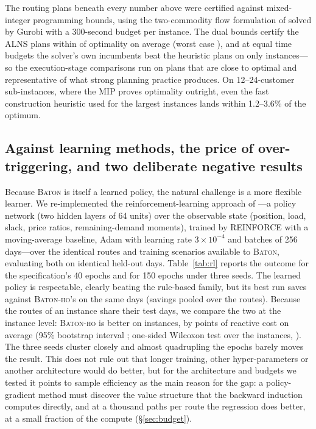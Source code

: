 \documentclass[preprint,authoryear,12pt]{elsarticle}
\theoremstyle{definition}
\theoremstyle{remark}
\begin{document}
The routing plans beneath every number above were certified against
mixed-integer programming bounds, using the two-commodity flow
formulation of \citet{montane2006tabu} solved by Gurobi with a
300-second budget per instance. The dual bounds certify the ALNS plans
within \certGap{} of optimality on average (worst case
\certGapMax{}), and at equal time budgets the solver's own incumbents
beat the heuristic plans on only \certBeatN{} instances---so the
execution-stage comparisons run on plans that are close to optimal and
representative of what strong planning practice produces. On 12--24-customer sub-instances, where the MIP proves
optimality outright, even the fast construction heuristic used for the
largest instances lands within 1.2--3.6\% of the optimum.

\subsection{Against learning methods, the price of over-triggering, and
two deliberate negative results}\label{sec:learning}

Because \textsc{Baton} is itself a learned policy, the natural
challenge is a more flexible learner. We re-implemented the
reinforcement-learning approach of \citet{iklassov2024rl}---a policy
network (two hidden layers of 64 units) over the observable state
(position, load, slack, price ratios, remaining-demand moments), trained
by REINFORCE with a moving-average baseline, Adam with learning rate
$3\times10^{-4}$ and batches of 256 days---over the identical routes and
training scenarios available to \textsc{Baton}, evaluating both on
identical held-out days. Table~\ref{tab:rl} reports the outcome for the
specification's 40 epochs and for 150 epochs under three seeds. The
learned policy is respectable, clearly beating the rule-based family,
but its best run saves \rlBest{} against \textsc{Baton-ho}'s
\rlBatonHo{} on the same days (savings pooled over the \nRL{} routes).
Because the routes of an instance share their test days, we compare the
two at the instance level: \textsc{Baton-ho} is better on
\rlInstWin{} instances, by \rlInstDelta{} points of reactive cost on
average (95\% bootstrap interval \rlInstCI; one-sided Wilcoxon test over
the \rlNInst{} instances, \rlWinP).
The three seeds cluster closely and almost quadrupling the epochs barely
moves the result. This does not rule out that longer training, other
hyper-parameters or another architecture would do better, but for the
architecture and budgets we tested it points to sample efficiency as the
main reason for the gap: a policy-gradient method must discover the value
structure that the backward induction computes directly, and at a
thousand paths per route the regression does better, at a small fraction
of the compute (\S\ref{sec:budget}).
\end{document}
